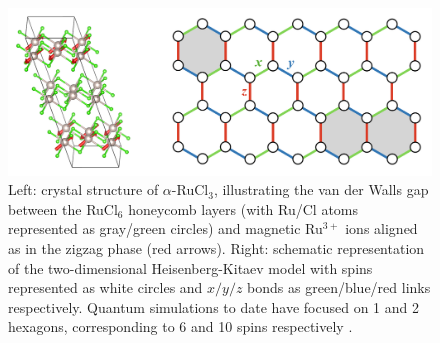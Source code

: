 \begin{figure}[htbp]
\centering
\includegraphics[width=\columnwidth]{groups/2._Use_case_discovery/spins.png}
\caption{Left: crystal structure of $\alpha$-RuCl$_3$, illustrating the van der Walls gap between the RuCl$_6$ honeycomb layers (with Ru/Cl atoms represented as gray/green circles) and magnetic Ru$^{3+}$ ions aligned as in the zigzag phase (red arrows). Right: schematic representation of the two-dimensional Heisenberg-Kitaev model with spins represented as white circles and $x/y/z$ bonds as green/blue/red links respectively. Quantum simulations to date have focused on 1 and 2 hexagons, corresponding to 6 and 10 spins respectively \cite{tazhigulov2022simulating}.}
\label{fig:rucl3}
\end{figure}


